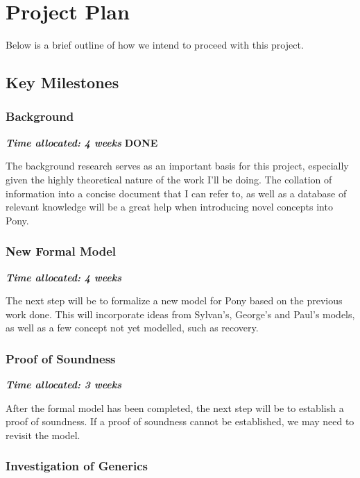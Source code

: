 \chapter{Project Plan}

Below is a brief outline of how we intend to proceed with this project.

\section{Key Milestones}

\subsection{Background}

\textit{\textbf{Time allocated: 4 weeks}} \hfill \textbf{DONE}

The background research serves as an important basis for this project, especially given the highly theoretical nature of the work I'll be doing. The collation of information into a concise document that I can refer to, as well as a database of relevant knowledge will be a great help when introducing novel concepts into Pony.

\subsection{New Formal Model}

\textit{\textbf{Time allocated: 4 weeks}}

The next step will be to formalize a new model for Pony based on the previous work done. This will incorporate ideas from Sylvan's, George's and Paul's models, as well as a few concept not yet modelled, such as recovery. 

\subsection{Proof of Soundness}

\textit{\textbf{Time allocated: 3 weeks}}

After the formal model has been completed, the next step will be to establish a proof of soundness. If a proof of soundness cannot be established, we may need to revisit the model.

\subsection{Investigation of Generics}

